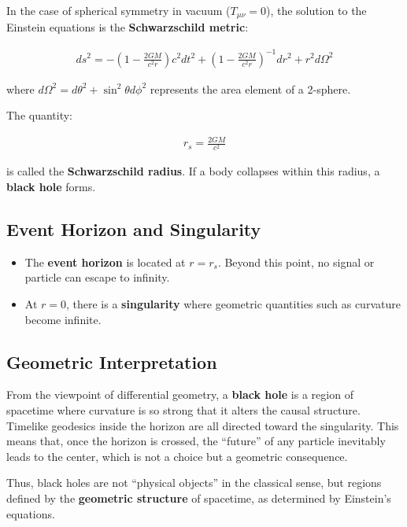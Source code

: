 \documentclass{aleph-revista}
\begin{document}
In the case of spherical symmetry in vacuum (\(T_{\mu\nu} = 0\)), the solution to the Einstein equations is the \textbf{Schwarzschild metric}:

\begin{align*}
ds^2 = -\left(1 - \frac{2GM}{c^2 r} \right)c^2 dt^2 + \left(1 - \frac{2GM}{c^2 r} \right)^{-1} dr^2 + r^2 d\Omega^2
\end{align*}

where $d\Omega^2 = d\theta^2 + \sin^2\theta d\phi^2$ represents the area element of a 2-sphere.

The quantity:

\begin{align*}
r_s = \frac{2GM}{c^2}
\end{align*}

is called the \textbf{Schwarzschild radius}. If a body collapses within this radius, a \textbf{black hole} forms.

\subsection{Event Horizon and Singularity}

\begin{itemize}
  \item The \textbf{event horizon} is located at \(r = r_s\). Beyond this point, no signal or particle can escape to infinity.
  \item At \(r = 0\), there is a \textbf{singularity} where geometric quantities such as curvature become infinite.
\end{itemize}

\subsection{Geometric Interpretation}

From the viewpoint of differential geometry, a \textbf{black hole} is a region of spacetime where curvature is so strong that it alters the causal structure. Timelike geodesics inside the horizon are all directed toward the singularity. This means that, once the horizon is crossed, the “future” of any particle inevitably leads to the center, which is not a choice but a geometric consequence.

Thus, black holes are not “physical objects” in the classical sense, but regions defined by the \textbf{geometric structure} of spacetime, as determined by Einstein's equations.

\end{document}
